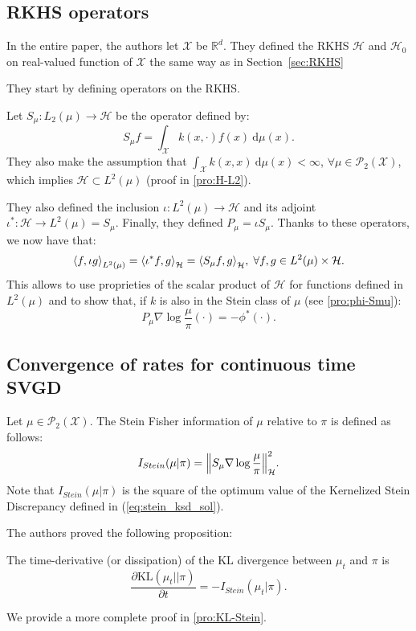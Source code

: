 \documentclass[runningheads,a4paper]{llncs}
\newcommand{\R}{\mathbb{R}}
\newcommand{\X}{\mathcal{X}}
\renewcommand{\P}{\mathcal{P}}
\newcommand{\KL}{\mathrm{KL}}
\renewcommand{\H}{\mathcal{H}}
\newcommand{\diff}[2]{\frac{\partial #1}{\partial #2}}
\renewcommand{\d}{\: \mathrm{d}}
\newcommand{\Stein}{I_{Stein}(\mu | \pi)}
\DeclarePairedDelimiter{\norm}{\|}{\|}
\DeclarePairedDelimiter{\sca}{\langle}{\rangle}
\begin{document}
\subsection{RKHS operators}
In the entire paper, the authors let $\X$ be $\R^d$. They defined
the RKHS $\H$ and $\H_0$ on real-valued function of $\X$ the same way as in
Section~\ref{sec:RKHS}

\noindent
They start by defining operators on the RKHS.
\begin{definition}
  Let $S_\mu : L_2(\mu) \to \H$ be the operator defined by:
  $$
  S_\mu f = \int_\X k(x, \cdot) f(x) \d \mu(x).
  $$
  They also make the assumption that $\int_\X k(x, x) \d \mu(x) < \infty$,
  $\forall \mu \in \P_2(\X)$, which implies $\H \subset L^2(\mu)$
  (proof in \ref{pro:H-L2}).
\label{def:S-mu}
\end{definition}
They also defined the inclusion $\iota : L^2(\mu) \to \H$ and
its adjoint $\iota^* : \H \to L^2(\mu) = S_\mu$. Finally, they defined
$P_\mu = \iota S_\mu$. Thanks to these operators, we now have that:
$$
\sca*{f, \iota g}_{L^2(\mu)} = \sca*{\iota^* f, g}_\H = \sca*{S_\mu f, g}_\H,
\; \forall f, g \in L^2(\mu) \times \H.
$$
This allows to use proprieties of the scalar product of $\H$ for functions
defined in $L^2(\mu)$ and to show that, if $k$ is also in the Stein class
of $\mu$ (see \ref{pro:phi-Smu}):
\begin{equation}
    P_\mu \nabla \log \frac{\mu}{\pi}(\cdot) = -\phi^*(\cdot).
    \label{eq:phi-Smu}
\end{equation}


\subsection{Convergence of rates for continuous time SVGD}
\begin{definition}
  Let $\mu \in \P_2(\X)$. The Stein Fisher information of $\mu$ relative to
  $\pi$ is defined as follows:
  $$
  \Stein = \norm*{S_\mu \nabla \log \frac{\mu}{\pi}}_\H^2.
  $$
  Note that $\Stein$ is the square of the optimum value of the
  Kernelized Stein Discrepancy defined in (\ref{eq:stein_ksd_sol}).
\end{definition}

The authors proved the following proposition:
\begin{proposition}\label{prop:KL-Stein}
  The time-derivative (or dissipation) of the $\KL$ divergence between $\mu_t$ and $\pi$ is
  $$
  \diff{\KL(\mu_t || \pi)}{t} = - I_{Stein}(\mu_t | \pi).
  $$
\end{proposition}
\noindent
We provide a more complete proof in \ref{pro:KL-Stein}.\\
\end{document}
